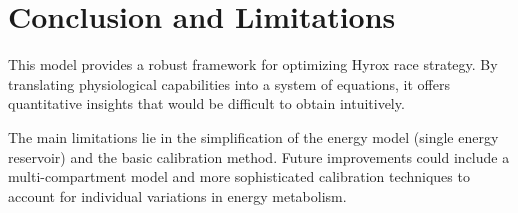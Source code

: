 \documentclass[11pt, a4paper]{article}
\begin{document}
	\section{Conclusion and Limitations}
	This model provides a robust framework for optimizing Hyrox race strategy. By translating physiological capabilities into a system of equations, it offers quantitative insights that would be difficult to obtain intuitively.
	
	The main limitations lie in the simplification of the energy model (single energy reservoir) and the basic calibration method. Future improvements could include a multi-compartment model and more sophisticated calibration techniques to account for individual variations in energy metabolism.
	
\end{document}
